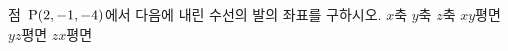 점~$\mathrm{P}(2{,}\mkern3mu\mathopen{}-1{,}\mkern3mu\mathopen{}-4)$에서 다음에 내린 수선의 발의 좌표를 구하시오.
 $x$축
 $y$축
 $z$축
 $xy$평면
 $yz$평면
 $zx$평면
